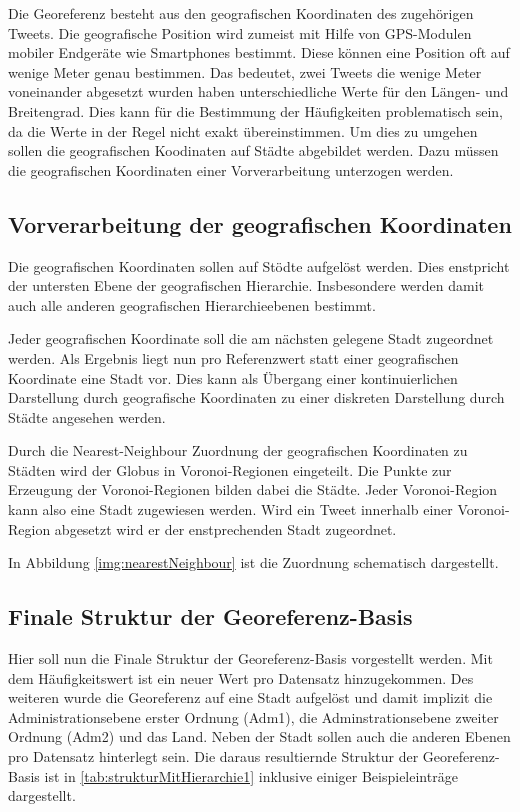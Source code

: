 			Die Georeferenz besteht aus den geografischen Koordinaten des zugehörigen Tweets.
			Die geografische Position wird zumeist mit Hilfe von GPS-Modulen mobiler Endgeräte wie Smartphones bestimmt. 
			Diese können eine Position oft auf wenige Meter genau bestimmen.
			Das bedeutet, zwei Tweets die wenige Meter voneinander abgesetzt wurden haben unterschiedliche Werte für den Längen- und Breitengrad.
			Dies kann für die Bestimmung der Häufigkeiten problematisch sein, da die Werte in der Regel nicht exakt übereinstimmen.
			Um dies zu umgehen sollen die geografischen Koodinaten auf Städte abgebildet werden.
			Dazu müssen die geografischen Koordinaten einer Vorverarbeitung unterzogen werden.

		\subsection{Vorverarbeitung der geografischen Koordinaten}

			Die geografischen Koordinaten sollen auf Stödte aufgelöst werden.
			Dies enstpricht der untersten Ebene der geografischen Hierarchie.
			Insbesondere werden damit auch alle anderen geografischen Hierarchieebenen bestimmt.

			Jeder geografischen Koordinate soll die am nächsten gelegene Stadt zugeordnet werden.
			Als Ergebnis liegt nun pro Referenzwert statt einer geografischen Koordinate eine Stadt vor.
			Dies kann als Übergang einer kontinuierlichen Darstellung durch geografische Koordinaten zu einer diskreten Darstellung durch Städte angesehen werden. 
			
			Durch die Nearest-Neighbour Zuordnung der geografischen Koordinaten zu Städten wird der Globus in Voronoi-Regionen eingeteilt.
			Die Punkte zur Erzeugung der Voronoi-Regionen bilden dabei die Städte. 
			Jeder Voronoi-Region kann also eine Stadt zugewiesen werden.
			Wird ein Tweet innerhalb einer Voronoi-Region abgesetzt wird er der enstprechenden Stadt zugeordnet.

			In Abbildung \ref{img:nearestNeighbour} ist die Zuordnung schematisch dargestellt.


		\subsection{Finale Struktur der Georeferenz-Basis} \label{subsec:finaleStruktur} 

			Hier soll nun die Finale Struktur der Georeferenz-Basis vorgestellt werden.
			Mit dem Häufigkeitswert ist ein neuer Wert pro Datensatz hinzugekommen.
			Des weiteren wurde die Georeferenz auf eine Stadt aufgelöst und damit implizit die Administrationsebene erster Ordnung (Adm1), die Adminstrationsebene zweiter Ordnung (Adm2) und das Land. 
			Neben der Stadt sollen auch die anderen Ebenen pro Datensatz hinterlegt sein.
			Die daraus resultiernde Struktur der Georeferenz-Basis ist in \ref{tab:strukturMitHierarchie1} inklusive einiger Beispieleinträge dargestellt.

